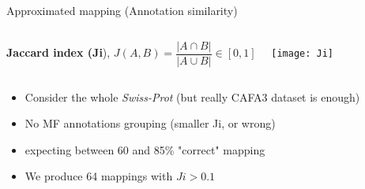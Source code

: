 \documentclass{beamer}
\newcommand{\keyword}[1]{\textbf{#1}}
\newcommand{\swissprot}{\textit{Swiss-Prot} }
\begin{document}
\begin{frame}{Approximated mapping (Annotation similarity)}

  \begin{columns}
    \keyword{Jaccard index (Ji}),
      $J(A,B) = \dfrac{|A \cap B|}{|A \cup B|} \in [0, 1] \quad $
      \texttt{[image: Ji]}
  \end{columns}

  \pause

  \begin{itemize}
    \item Consider the whole \swissprot (but really CAFA3 dataset is enough)
      \pause
    \item No MF annotations grouping (smaller Ji, or wrong) 
      \pause
  \item expecting between 60 and 85\% "correct" mapping
      \pause
  \item We produce 64 mappings with $Ji>0.1$

  \end{itemize}
\end{frame}
\end{document}
